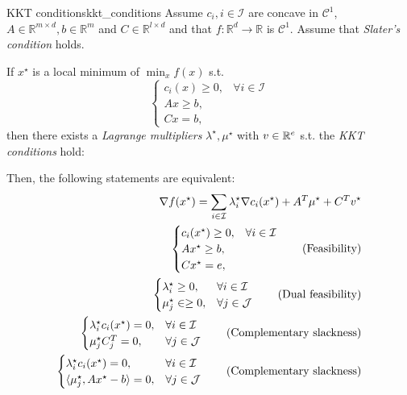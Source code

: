 \begin{theorem}{KKT conditions}{kkt_conditions}
	Assume \(c_i, i \in \mathcal{I}\) are concave in \(\mathcal{C}^1\),
	\(A\in \mathbb{R}^{m \times d}, b \in \mathbb{R}^m\) and \(C\in \mathbb{R}^{l \times d}\) and that \(f:\mathbb{R}^d \to \mathbb{R}\) is \(\mathcal{C}^1\). Assume that \emph{Slater's condition} holds.

	If \(x^\star\) is a local minimum of \(\min_x f(x)\) s.t.
	\[
		\begin{cases}
			c_i(x) \geq 0, & \forall i \in \mathcal{I} \\
			Ax \geq b,     &                           \\
			Cx = b,        &
		\end{cases}
	\]
	then there exists a \emph{Lagrange multipliers} \(\lambda^\star, \mu^\star\) with \(v \in \mathbb{R}^e\) s.t. the \emph{KKT conditions} hold:

	Then, the following statements are equivalent:
	\begin{align}
		\nabla f(x^\star) = \sum_{i\in \mathcal{I}} \lambda_i^\star \nabla c_i(x^\star) + A^T \mu^\star + C^T v^\star \\
		\begin{cases}
			c_i(x^\star) \geq 0, & \forall i \in \mathcal{I} \\
			Ax^\star \geq b,     &                           \\
			Cx^\star = e,        &                           \\
		\end{cases} \tag{Feasibility}                                                              \\
		\begin{cases}
			\lambda_i^\star \geq 0, & \forall i \in \mathcal{I} \\
			\mu_j^\star \in \geq 0, & \forall j \in \mathcal{J} \\
		\end{cases} \tag{Dual feasibility}                                                           \\
		\begin{cases}
			\lambda_i^\star c_i(x^\star) = 0, & \forall i \in \mathcal{I} \\
			\mu_j^\star C_j^T = 0,            & \forall j \in \mathcal{J} \\
		\end{cases} \tag{Complementary slackness}                                                 \\
		\begin{cases}
			\lambda_i^\star c_i(x^\star) = 0,      & \forall i \in \mathcal{I} \\
			\langle\mu_j^\star, Ax^\star - b\rangle = 0, & \forall j \in \mathcal{J} \\
		\end{cases} \tag{Complementary slackness}
	\end{align}
\end{theorem}


